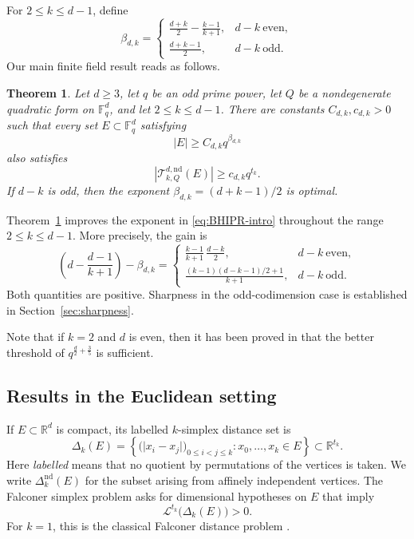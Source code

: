 \documentclass[11pt]{article}
\newtheorem{theorem}{Theorem}[section]
\theoremstyle{remark}
\newcommand{\R}{\mathbb R}
\newcommand{\cL}{\mathcal L}
\numberwithin{equation}{section}
\newcommand{\Fq}{\mathbb F_q}
\newcommand{\cT}{\mathcal T}
\newcommand{\1}{\mathbf 1}
\begin{document}
For \(2\leq k\leq d-1\), define
\begin{equation}\label{eq:beta}
 \beta_{d,k}=
 \begin{cases}
 \displaystyle \frac{d+k}{2}-\frac{k-1}{k+1},
       & d-k\ \mathrm{even},\\[2mm]
 \displaystyle \frac{d+k-1}{2},
       & d-k\ \mathrm{odd}.
 \end{cases}
\end{equation}
Our main finite field result reads as follows.
\begin{theorem}\label{thm:finite-main}
Let \(d\geq3\), let \(q\) be an odd prime power, let \(Q\) be a
nondegenerate quadratic form on \(\Fq^d\), and let
\(2\leq k\leq d-1\).  There are constants
\(C_{d,k},c_{d,k}>0\) such that every set \(E\subset\Fq^d\)
satisfying
\[
 |E|\geq C_{d,k}q^{\beta_{d,k}}
\]
also satisfies
\[
 |\cT^{d,\mathrm{nd}}_{k,Q}(E)|
 \geq c_{d,k}q^{t_k}.
\]
If \(d-k\) is odd, then the exponent $\beta_{d,k}=(d+k-1)/2$ is optimal.
\end{theorem}

Theorem~\ref{thm:finite-main} improves the exponent in
\eqref{eq:BHIPR-intro} throughout the range \(2\leq k\leq d-1\).
More precisely, the gain is
\[
 \left(d-\frac{d-1}{k+1}\right)-\beta_{d,k}
 =
 \begin{cases}
 \displaystyle
 \frac{k-1}{k+1}\,\frac{d-k}{2},
       & d-k\ \mathrm{even},\\[3mm]
 \displaystyle
 \frac{(k-1)(d-k-1)/2+1}{k+1},
       & d-k\ \mathrm{odd}.
 \end{cases}
\]
Both quantities are positive. Sharpness in the odd-codimension case is established in
Section~\ref{sec:sharpness}.

Note that if $k=2$ and $d$ is even, then it has been proved in \cite{PSX} that the better threshold of $q^{\frac{d}{2}+\frac{3}{5}}$ is sufficient. 

\subsection{Results in the Euclidean setting}

If \(E\subset\R^d\) is compact, its labelled \(k\)-simplex distance
set is
\[
\Delta_k(E)
=
\left\{
\bigl(\lvert x_i-x_j\rvert\bigr)_{0\leq i<j\leq k}
:
x_0,\ldots,x_k\in E
\right\}
\subset\R^{t_k}.
\]
Here \emph{labelled} means that no quotient by permutations of the
vertices is taken.  We write \(\Delta_k^{\mathrm{nd}}(E)\) for the
subset arising from affinely independent vertices.  The Falconer
simplex problem asks for dimensional hypotheses on \(E\) that imply
\[
        \cL^{t_k}\bigl(\Delta_k(E)\bigr)>0.
\]
For \(k=1\), this is the classical Falconer distance problem \cite{Falconer}.
\end{document}
